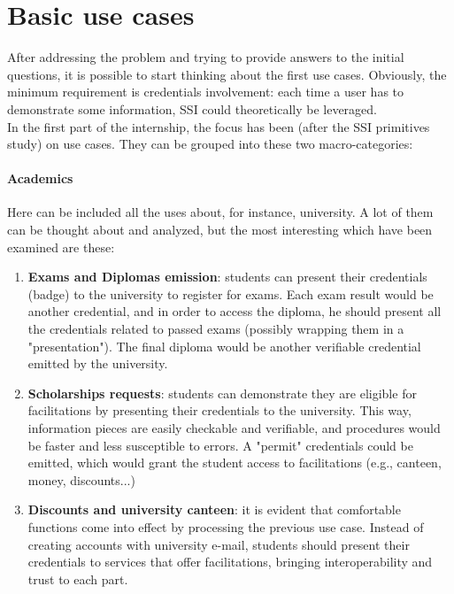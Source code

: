 \section{Basic use cases}
After addressing the problem and trying to provide answers to the initial 
questions, it is possible to start thinking about the first use cases.
Obviously, the minimum requirement is credentials involvement: each time a user 
has to demonstrate some information, SSI could theoretically be leveraged.
\vspace*{0.3cm}\\
In the first part of the internship, the focus has been (after the SSI primitives 
study) on use cases. They can be grouped into these two macro-categories:
\paragraph{Academics}
Here can be included all the uses about, for instance, university. A lot of them 
can be thought about and analyzed, but the most interesting which have been examined 
are these:
\begin{enumerate}
    \item \textbf{Exams and Diplomas emission}: students can present 
    their credentials (badge) to the university to register for exams. 
    Each exam result would be another credential, and in order to access the 
    diploma, he should present all the credentials related to passed exams 
    (possibly wrapping them in a "presentation"). The final diploma would 
    be another verifiable credential emitted by the university.
    \item \textbf{Scholarships requests}: students can demonstrate they are 
    eligible for facilitations by presenting their credentials to the university. 
    This way, information pieces are easily checkable and verifiable, and procedures 
    would be faster and less susceptible to errors. A "permit" credentials could be 
    emitted, which would grant the student access to facilitations (e.g., canteen,  
    money, discounts...)
    \item \textbf{Discounts and university canteen}: it is evident that comfortable
    functions come into effect by processing the previous use case. Instead of 
    creating accounts with university e-mail, students should present their 
    credentials to services that offer facilitations, bringing interoperability 
    and trust to each part.
\end{enumerate}
    
